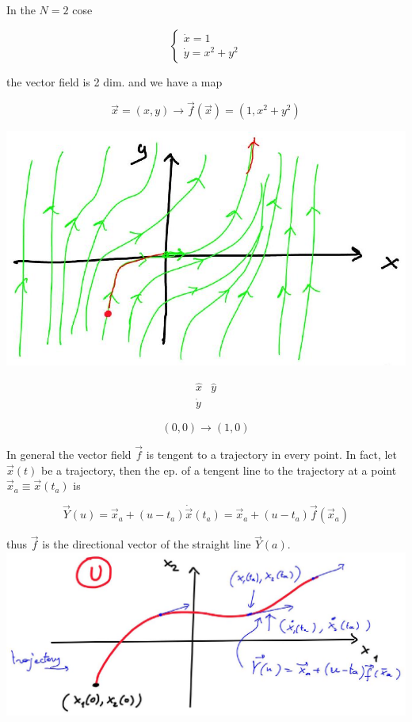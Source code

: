 \documentclass[10pt]{article}
\begin{document}
In the $N=2$ cose

$$
\left\{\begin{array}{l}
\dot{x}=1 \\
\dot{y}=x^{2}+y^{2}
\end{array}\right.
$$

the vector field is 2 dim. and we have a map

$$
\vec{x}=(x, y) \longrightarrow \vec{f}(\vec{x})=\left(1, x^{2}+y^{2}\right)
$$

\begin{center}
\includegraphics[max width=\textwidth]{2025_10_19_11b40f5928aca93f9d20g-5}
\end{center}

$$
\begin{array}{ll}
\hat{x} & \hat{y} \\
\dot{y}
\end{array}
$$

$$
(0,0) \longrightarrow(1,0)
$$

In general the vector field $\vec{f}$ is tengent to a trajectory in every point. In fact, let $\vec{x}(t)$ be a trajectory, then the ep. of a tengent line to the trajectory at a point $\vec{x}_{a} \equiv \vec{x}\left(t_{a}\right)$ is

$$
\vec{Y}(u)=\vec{x}_{a}+\left(u-t_{a}\right) \dot{\vec{x}}\left(t_{a}\right)=\vec{x}_{a}+\left(u-t_{a}\right) \vec{f}\left(\vec{x}_{a}\right)
$$

thus $\vec{f}$ is the directional vector of the straight line $\vec{Y}(a)$.\\
\includegraphics[max width=\textwidth, center]{2025_10_19_11b40f5928aca93f9d20g-5(1)}
\end{document}
